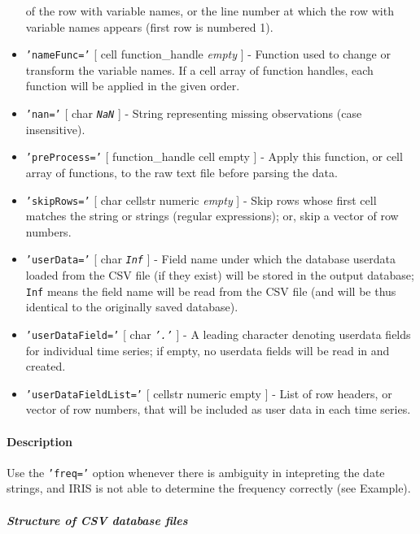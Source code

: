 \begin{itemize}
  of the row with variable names, or the line number at which the row
  with variable names appears (first row is numbered 1).
\item
  \texttt{'nameFunc='} {[} cell \textbar{} function\_handle \textbar{}
  \emph{empty} {]} - Function used to change or transform the variable
  names. If a cell array of function handles, each function will be
  applied in the given order.
\item
  \texttt{'nan='} {[} char \textbar{} \emph{\texttt{NaN}} {]} - String
  representing missing observations (case insensitive).
\item
  \texttt{'preProcess='} {[} function\_handle \textbar{} cell \textbar{}
  empty {]} - Apply this function, or cell array of functions, to the
  raw text file before parsing the data.
\item
  \texttt{'skipRows='} {[} char \textbar{} cellstr \textbar{} numeric
  \textbar{} \emph{empty} {]} - Skip rows whose first cell matches the
  string or strings (regular expressions); or, skip a vector of row
  numbers.
\item
  \texttt{'userData='} {[} char \textbar{} \emph{\texttt{Inf}} {]} -
  Field name under which the database userdata loaded from the CSV file
  (if they exist) will be stored in the output database; \texttt{Inf}
  means the field name will be read from the CSV file (and will be thus
  identical to the originally saved database).
\item
  \texttt{'userDataField='} {[} char \textbar{} \emph{\texttt{'.'}} {]}
  - A leading character denoting userdata fields for individual time
  series; if empty, no userdata fields will be read in and created.
\item
  \texttt{'userDataFieldList='} {[} cellstr \textbar{} numeric
  \textbar{} empty {]} - List of row headers, or vector of row numbers,
  that will be included as user data in each time series.
\end{itemize}

\paragraph{Description}\label{description}

Use the \texttt{'freq='} option whenever there is ambiguity in
intepreting the date strings, and IRIS is not able to determine the
frequency correctly (see Example).

\subparagraph{Structure of CSV database
files}\label{structure-of-csv-database-files}

